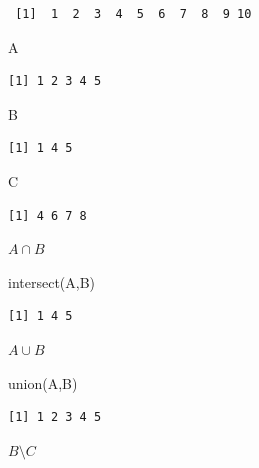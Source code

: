 \documentclass[
  letterpaper,
  DIV=11,
  numbers=noendperiod]{scrreprt}
\newenvironment{Shaded}{\begin{snugshade}}{\end{snugshade}}
\newcommand{\FunctionTok}[1]{\textcolor[rgb]{0.28,0.35,0.67}{#1}}
\newcommand{\NormalTok}[1]{\textcolor[rgb]{0.00,0.23,0.31}{#1}}
\begin{document}
\begin{verbatim}
 [1]  1  2  3  4  5  6  7  8  9 10
\end{verbatim}

\begin{Shaded}
\begin{Highlighting}[]
\NormalTok{A}
\end{Highlighting}
\end{Shaded}

\begin{verbatim}
[1] 1 2 3 4 5
\end{verbatim}

\begin{Shaded}
\begin{Highlighting}[]
\NormalTok{B}
\end{Highlighting}
\end{Shaded}

\begin{verbatim}
[1] 1 4 5
\end{verbatim}

\begin{Shaded}
\begin{Highlighting}[]
\NormalTok{C}
\end{Highlighting}
\end{Shaded}

\begin{verbatim}
[1] 4 6 7 8
\end{verbatim}

\(A\cap B\)

\begin{Shaded}
\begin{Highlighting}[]
\FunctionTok{intersect}\NormalTok{(A,B)}
\end{Highlighting}
\end{Shaded}

\begin{verbatim}
[1] 1 4 5
\end{verbatim}

\(A\cup B\)

\begin{Shaded}
\begin{Highlighting}[]
\FunctionTok{union}\NormalTok{(A,B)}
\end{Highlighting}
\end{Shaded}

\begin{verbatim}
[1] 1 2 3 4 5
\end{verbatim}

\(B\setminus C\)
\end{document}
